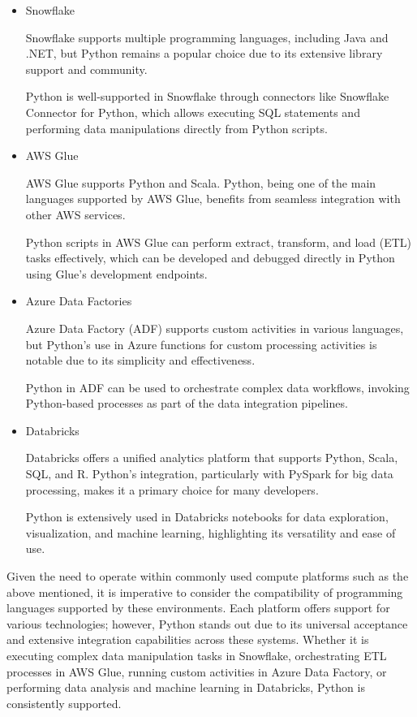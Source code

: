 \begin{itemize}
\item  Snowflake

Snowflake supports multiple programming languages, including Java and .NET, but Python remains a popular choice due to its extensive library support and community.

Python is well-supported in Snowflake through connectors like Snowflake Connector for Python, which allows executing SQL statements and performing data manipulations directly from Python scripts.


\item AWS Glue

    AWS Glue supports Python and Scala. Python, being one of the main languages supported by AWS Glue, benefits from seamless integration with other AWS services.
    
    Python scripts in AWS Glue can perform extract, transform, and load (ETL) tasks effectively, which can be developed and debugged directly in Python using Glue’s development endpoints.


    \item Azure Data Factories

    Azure Data Factory (ADF) supports custom activities in various languages, but Python’s use in Azure functions for custom processing activities is notable due to its simplicity and effectiveness.
   
    Python in ADF can be used to orchestrate complex data workflows, invoking Python-based processes as part of the data integration pipelines.


    \item Databricks

    Databricks offers a unified analytics platform that supports Python, Scala, SQL, and R. Python’s integration, particularly with PySpark for big data processing, makes it a primary choice for many developers.

    Python is extensively used in Databricks notebooks for data exploration, visualization, and machine learning, highlighting its versatility and ease of use.

\end{itemize}


Given the need to operate within commonly used compute platforms such as the above mentioned, it is imperative to consider the compatibility of programming languages supported by these environments. Each platform offers support for various technologies; however, Python stands out due to its universal acceptance and extensive integration capabilities across these systems. Whether it is executing complex data manipulation tasks in Snowflake, orchestrating ETL processes in AWS Glue, running custom activities in Azure Data Factory, or performing data analysis and machine learning in Databricks, Python is consistently supported. 

